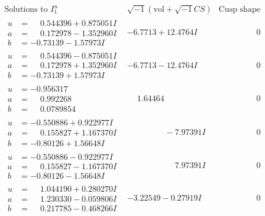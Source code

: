\documentclass[1p]{elsarticle_modified}
\theoremstyle{definition}
\newcommand{\I}{\sqrt{-1}}
\begin{document}
$$\begin{array}{c|c|c}  
\text{Solutions to }I^u_{1}& \I (\text{vol} + \sqrt{-1}CS) & \text{Cusp shape}\\
 \hline 
\begin{aligned}
u &= \phantom{-}0.544396 + 0.875051 I \\
a &= \phantom{-}0.172978 - 1.352960 I \\
b &= -0.73139 - 1.57973 I\end{aligned}
 & -6.7713 + 12.4764 I & \phantom{-0.000000 } 0 \\ \hline\begin{aligned}
u &= \phantom{-}0.544396 - 0.875051 I \\
a &= \phantom{-}0.172978 + 1.352960 I \\
b &= -0.73139 + 1.57973 I\end{aligned}
 & -6.7713 - 12.4764 I & \phantom{-0.000000 } 0 \\ \hline\begin{aligned}
u &= -0.956317\phantom{ +0.000000I} \\
a &= \phantom{-}0.992268\phantom{ +0.000000I} \\
b &= \phantom{-}0.0789854\phantom{ +0.000000I}\end{aligned}
 & \phantom{-}1.64464\phantom{ +0.000000I} & \phantom{-0.000000 } 0 \\ \hline\begin{aligned}
u &= -0.550886 + 0.922977 I \\
a &= \phantom{-}0.155827 + 1.167370 I \\
b &= -0.80126 + 1.56648 I\end{aligned}
 & \phantom{-0.000000 } -7.97391 I & \phantom{-0.000000 } 0 \\ \hline\begin{aligned}
u &= -0.550886 - 0.922977 I \\
a &= \phantom{-}0.155827 - 1.167370 I \\
b &= -0.80126 - 1.56648 I\end{aligned}
 & \phantom{-0.000000 -}7.97391 I & \phantom{-0.000000 } 0 \\ \hline\begin{aligned}
u &= \phantom{-}1.044190 + 0.280270 I \\
a &= \phantom{-}1.230330 - 0.059806 I \\
b &= \phantom{-}0.217785 - 0.468266 I\end{aligned}
 & -3.22549 - 0.27919 I & \phantom{-0.000000 } 0 \\ \hline\begin{aligned}

\end{aligned}
\end{array}$$
\end{document}

